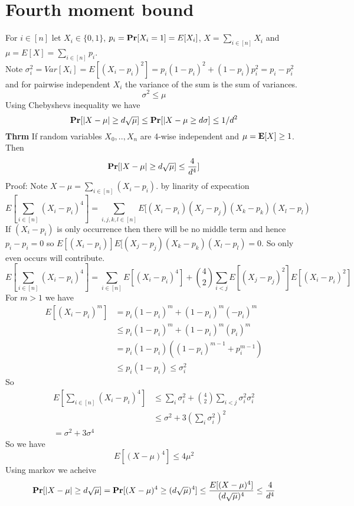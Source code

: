 \documentclass[a4paper]{article}
\def\E{\mbox{\textbf{E}}}
\def\Pr{\mbox{\textbf{Pr}}}
\begin{document}
\section{Fourth moment bound}
For \(i \in [n]\) let \(X_i \in \{0,1\}\), \(p_i = \Pr[X_i = 1] = E[X_i]\), \(X = \sum_{i\in [n]} X_i\) and \(\mu = E[X] = \sum_{i \in [n]} p_i\).\\
Note \(\sigma_i^2 = Var[X_i] = E[(X_i - p_i)^2] = p_i(1-p_i)^2 + (1-p_i)p_i^2 = p_i - p_i^2\) and for pairwise independent \(X_i\) the variance of the sum is the sum of variances.
\[\sigma^2 \leq \mu\]
Using Chebyshevs inequality we have
\[\Pr[|X-\mu| \geq d \sqrt{\mu}] \leq \Pr[|X-\mu \geq d \sigma] \leq 1/d^2\]
\textbf{Thrm} If random variables \(X_0,..,X_n\) are 4-wise independent and \(\mu = \E[X] \geq 1\). Then
\begin{equation}
\Pr[|X-\mu| \geq d\sqrt{\mu}] \leq \frac{4}{d^4}]
\end{equation}
Proof: Note \(X-\mu = \sum_{i\in [n]} (X_i -p_i)\). by linarity of expecation
\[E[\sum_{i\in [n]} (X_i-p_i)^4] = \sum_{i,j,k,l \in [n]} E[(X_i-p_i)(X_j-p_j)(X_k -p_k)(X_l - p_l)\]  
If \((X_i - p_i)\) is only occurrence  then there will be no middle term and hence \(p_i-p_i = 0\) so \(E[(X_i-p_i)]E[(X_j-p_j)(X_k -p_k)(X_l - p_l)=0\). So only even occurs will contribute.
\[E[\sum_{i\in [n]} (X_i-p_i)^4] = \sum_{i \in [n]} E[(X_i-p_i)^4] + {4 \choose 2} \sum_{i < j} E[(X_j-p_j)^2]E[(X_i-p_i)^2] \]  
For \(m>1\) we have
\begin{align}
E[(X_i-p_i)^m] &= p_i(1-p_i)^m + (1-p_i)^m(-p_i)^m\\
               &\leq p_i(1-p_i)^m + (1-p_i)^m(p_i)^m\\
               &= p_i(1-p_i)((1-p_i)^{m-1} + p_i^{m-1})\\
               &\leq p_i(1-p_i) \leq \sigma_i^2
\end{align}
So
\begin{align}
E[\sum_{i\in [n]} (X_i-p_i)^4] &\leq \sum_i \sigma_i^2+{4 \choose 2} \sum_{i<j} \sigma_i^2\sigma_i^2\\
                               &\leq \sigma^2 + 3(\sum_i \sigma_i^2)^2\\
                               = \sigma^2 + 3\sigma^4
\end{align}
So we have
\[E[(X-\mu)^4] \leq 4 \mu^2\]
Using markov we acheive
\[\Pr[|X-\mu| \geq d\sqrt{\mu}] = \Pr[(X-\mu)^4 \geq (d\sqrt{\mu})^4] \leq \frac{E[(X-\mu)^4]}{(d\sqrt{\mu})^4} \leq \frac{4}{d^4}\]
\end{document}
